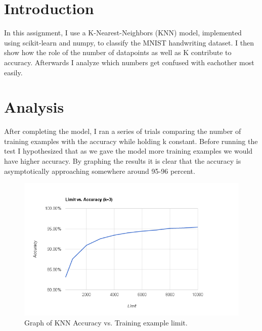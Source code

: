 \documentclass{article}
\begin{document}
 


\section{Introduction}

In this assignment, I use a K-Nearest-Neighbors (KNN) model, implemented using scikit-learn and numpy, to classify the MNIST handwriting dataset. I then show how the role of the number of datapoints as well as K contribute to accuracy. Afterwards I analyze which numbers get confused with eachother most easily. 

\section{Analysis}

After completing the model, I ran a series of trials comparing the number of training examples with the accuracy while holding k constant. Before running the test I hypothesized that as we gave the model more training examples we would have higher accuracy. By graphing the results it is clear that the accuracy is asymptotically approaching somewhere around 95-96 percent.

\begin{figure}[!ht]

  \caption{Graph of KNN Accuracy vs. Training example limit.}
  \includegraphics[width=\columnwidth]{limit.png}

\end{figure}
\end{document}
